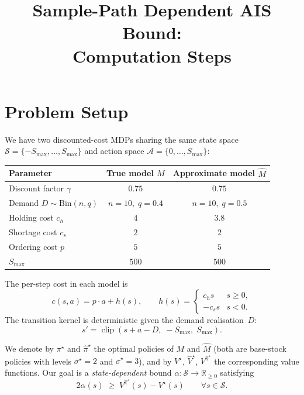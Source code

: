 \documentclass[11pt]{article}
\title{Sample-Path Dependent AIS Bound:\\ Computation Steps}
\author{}
\date{}
\newcommand{\Smax}{S_{\max}}
\newcommand{\clip}{\operatorname{clip}}
\newcommand{\pistar}{\pi^\star}
\newcommand{\pihatstar}{\hat\pi^\star}
\newcommand{\Vstar}{V^\star}
\newcommand{\Vhatstar}{\hat V^\star}
\newcommand{\Vpihat}{V^{\pihatstar}}
\begin{document}
\maketitle

\section{Problem Setup}

We have two discounted-cost MDPs sharing the same state space
$\mathcal{S} = \{-\Smax, \ldots, \Smax\}$ and action space
$\mathcal{A} = \{0, \ldots, \Smax\}$:
%
\begin{center}
\begin{tabular}{lcc}
\toprule
Parameter & True model $M$ & Approximate model $\hat M$ \\
\midrule
Discount factor $\gamma$ & $0.75$ & $0.75$ \\
Demand $D \sim \mathrm{Bin}(n,q)$ & $n=10,\; q=0.4$ & $n=10,\; q=0.5$ \\
Holding cost $c_h$ & $4$ & $3.8$ \\
Shortage cost $c_s$ & $2$ & $2$ \\
Ordering cost $p$ & $5$ & $5$ \\
$\Smax$ & $500$ & $500$ \\
\bottomrule
\end{tabular}
\end{center}

The per-step cost in each model is
\[
  c(s,a) = p \cdot a + h(s),
  \qquad
  h(s) = \begin{cases} c_h   s & s \ge 0, \\ -c_s   s & s < 0. \end{cases}
\]
The transition kernel is deterministic given the demand realisation~$D$:
\[
  s' = \clip(s + a - D,\; -\Smax,\; \Smax).
\]

We denote by $\pistar$ and $\pihatstar$ the optimal policies of $M$ and $\hat M$
(both are base-stock policies with levels $\sigma^\star = 2$ and
$\hat\sigma^\star = 3$), and by $\Vstar$, $\Vhatstar$, $\Vpihat$ the
corresponding value functions.  Our goal is a \emph{state-dependent} bound
$\alpha \colon \mathcal{S} \to \mathbb{R}_{\ge 0}$ satisfying
\begin{equation}\label{eq:goal}
  2 \alpha(s) \;\ge\; \Vpihat(s) - \Vstar(s) \qquad \forall  s \in \mathcal{S}.
\end{equation}
\end{document}
